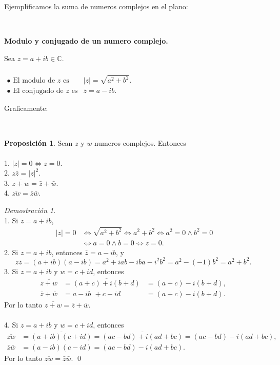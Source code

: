 \documentclass{article}
\theoremstyle{definition}
\theoremstyle{definition}
\newtheorem{prop}[teo]{Proposición}
\theoremstyle{remark}
\newtheorem*{demo}{Demostración}
\begin{document}
\pagebreak
Ejemplificamos la suma de numeros complejos en el plano:\\
\begin{figure}[h]
\centering
\def\svgwidth{0.5\textwidth}

\end{figure}\\
 \begin{center}
\textbf{Modulo y conjugado de un numero complejo.}
\end{center}
\begin{defi}
  Sea $z=a+ib \in \mathbb{C}$. \\\\ $\begin{array}{llll}
    \bullet \text{ El modulo de $z$ es} & |z|=\sqrt{a^2+b^2}. \\
    \bullet \text{ El conjugado de $z$ es} & \bar{z}=a-ib.
\end{array}$
\end{defi}
Graficamente:
\begin{figure}[h]
\centering
\def\svgwidth{0.5\textwidth}

\end{figure}\\
\begin{prop}
  Sean $z$ y $w$ numeros complejos. Entonces \\\\
  1. $|z|=0 \Leftrightarrow z=0$.\\
  2.  $z\bar{z}=|z|^2$.\\
  3. $\overline{z+w}= \bar{z}+\bar{w}$. \\
  4. $\overline{zw}=\bar{z}\bar{w}$.
\end{prop}
\begin{demo} \; \\
  1. Si $z=a+ib$, \[
\begin{aligned}
\;|z|=0 &\Leftrightarrow \sqrt{a^2+b^2} \Leftrightarrow a^2+b^2 \Leftrightarrow a^2=0 \land b^2 =0 \\
& \Leftrightarrow a=0 \land b=0 \Leftrightarrow z=0.
\end{aligned}
  \]
  2. Si $z=a+ib$, entonces $\bar{z}=a-ib$, y \[
z\bar{z}=(a+ib)(a-ib)=a^2+iab-iba-i^2b^2=a^2-(-1)b^2=a^2+b^2.
  \]
  3. Si $z=a+ib$ y $w=c+id$, entonces \[\begin{aligned}
\overline{z+w}&=\overline{(a+c)+i(b+d)}&=(a+c)-i(b+d),\\
\bar{z}+\bar{w}&=a-ib\phantom{)}+c-id&=(a+c)-i(b+d).
\end{aligned}
  \]
  Por lo tanto $\overline{z+w}=\bar{z}+\bar{w}$.\\\\
  4. Si $z=a+ib$ y $w=c+id$, entonces \[\begin{aligned}
\overline{zw}&=\overline{(a+ib)(c+id)}=\overline{(ac-bd)+i(ad+bc)}=(ac-bd)-i(ad+bc),\\
\bar{z}\bar{w}&=(a-ib)(c-id)=(ac-bd)-i(ad+bc).\end{aligned}
  \]
  Por lo tanto $\overline{zw}=\bar{z}\bar{w}$. \qed
\end{demo}
\end{document}
